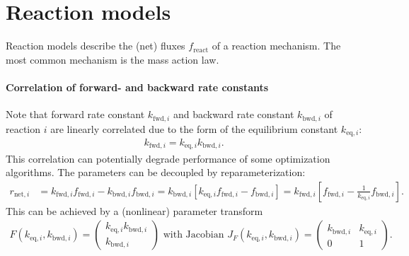 %  
%  

\section{Reaction models}

Reaction models  describe the (net) fluxes $f_{\text{react}}$ of a reaction mechanism.
The most common mechanism is the mass action law.

\paragraph{Correlation of forward- and backward rate constants}

Note that forward rate constant $k_{\text{fwd},i}$ and backward rate constant $k_{\text{bwd},i}$ of reaction $i$ are linearly correlated due to the form of the equilibrium constant $k_{\text{eq},i}$:
\begin{align*}
  k_{\text{fwd},i} = k_{\text{eq},i} k_{\text{bwd},i}.
\end{align*}
This correlation can potentially degrade performance of some optimization algorithms.
The parameters can be decoupled by reparameterization:
\begin{align*}
  r_{\text{net},i} &= k_{\text{fwd},i} f_{\text{fwd},i} - k_{\text{bwd},i} f_{\text{bwd},i} = k_{\text{bwd},i} \left[ k_{\text{eq},i} f_{\text{fwd},i} - f_{\text{bwd},i} \right] = k_{\text{fwd},i} \left[ f_{\text{fwd},i} - \frac{1}{k_{\text{eq},i}} f_{\text{bwd},i} \right].
\end{align*}
This can be achieved by a (nonlinear) parameter transform
\begin{align*}
  F\left( k_{\text{eq},i}, k_{\text{bwd},i} \right) = \begin{pmatrix} k_{\text{eq},i} k_{\text{bwd},i} \\ k_{\text{bwd},i} \end{pmatrix} \text{ with Jacobian } J_F\left( k_{\text{eq},i}, k_{\text{bwd},i} \right) = \begin{pmatrix} k_{\text{bwd},i} & k_{\text{eq},i} \\ 0 & 1 \end{pmatrix}.
\end{align*}

